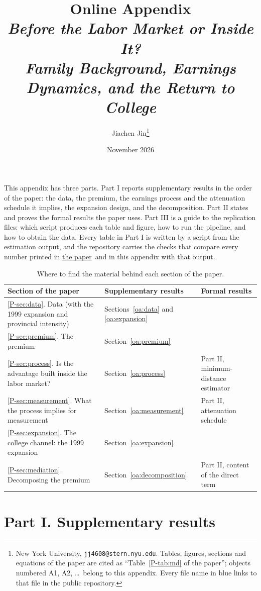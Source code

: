 \documentclass[11pt]{article}
\title{Online Appendix\\[6pt]
{\large\emph{Before the Labor Market or Inside It?\\[-6pt] Family Background, Earnings Dynamics, and the Return to College}}}
\author{Jiachen Jin\thanks{New York University,
\texttt{jj4608@stern.nyu.edu}. Tables, figures, sections and equations
of the paper are cited as ``Table~\ref{P-tab:md} of the paper''; objects
numbered A1, A2, \ldots\ belong to this appendix. Every file name in blue links to that file in the public repository.}}
\date{November 2026}
\numberwithin{equation}{section}
\newcommand{\repourl}{https://github.com/JiachenJin1001/before-the-labor-market-or-inside-it}
\newcommand{\paperpdf}{\href{\repourl/blob/main/unified/paper/main.pdf}{the paper}}
\begin{document}
\maketitle
\thispagestyle{empty}

\noindent This appendix has three parts. Part I reports supplementary
results in the order of the paper: the data, the premium, the earnings process and the
attenuation schedule it implies, the expansion design, and the
decomposition. Part II states and proves the formal results the paper
uses. Part III is a guide to the replication files: which script
produces each table and figure, how to run the pipeline, and how to
obtain the data. Every table in Part I is written by a script from the estimation output, and the repository carries the
checks that compare every number printed in \paperpdf\ and in this appendix with that output.

\begin{table}[H]
\centering
\small
\caption{Where to find the material behind each section of the paper.}
\label{oatab:map}
\begin{tabular}{@{}L{5.4cm}L{5.6cm}L{4.0cm}@{}}
\toprule
Section of the paper & Supplementary results & Formal results \\
\midrule
\ref{P-sec:data}. Data (with the 1999 expansion and provincial intensity) & Sections~\ref{oa:data} and \ref{oa:expansion} & \\
\ref{P-sec:premium}. The premium & Section~\ref{oa:premium} & \\
\ref{P-sec:process}. Is the advantage built inside the labor market? &
Section~\ref{oa:process} & Part II, minimum-distance estimator \\
\ref{P-sec:measurement}. What the process implies for measurement &
Section~\ref{oa:measurement} & Part II, attenuation schedule \\
\ref{P-sec:expansion}. The college channel: the 1999 expansion &
Section~\ref{oa:expansion} & \\
\ref{P-sec:mediation}. Decomposing the premium &
Section~\ref{oa:decomposition} & Part II, content of the direct term \\
\bottomrule
\end{tabular}
\end{table}

\clearpage
\tableofcontents
\newpage

\part*{Part I. Supplementary results}
\end{document}

